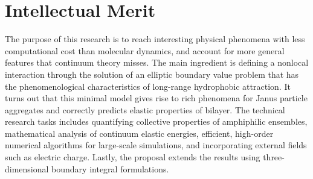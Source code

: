 %
%

\section{Intellectual Merit}
The purpose of this research is to reach interesting physical phenomena with 
less computational cost than molecular dynamics, and account for more general
features that continuum theory misses. The main ingredient is defining a 
nonlocal interaction through the solution of an elliptic boundary value problem
that has the phenomenological characteristics of long-range hydrophobic
attraction. It turns out that this minimal model gives rise to rich phenomena
for Janus particle aggregates and correctly predicts elastic properties of bilayer. 
The technical research tasks includes quantifying collective properties of 
amphiphilic ensembles, mathematical analysis of continuum elastic energies, 
efficient, high-order numerical algorithms for large-scale simulations, and 
incorporating external fields such as electric charge. Lastly, the proposal 
extends the results using three-dimensional boundary integral formulations.


